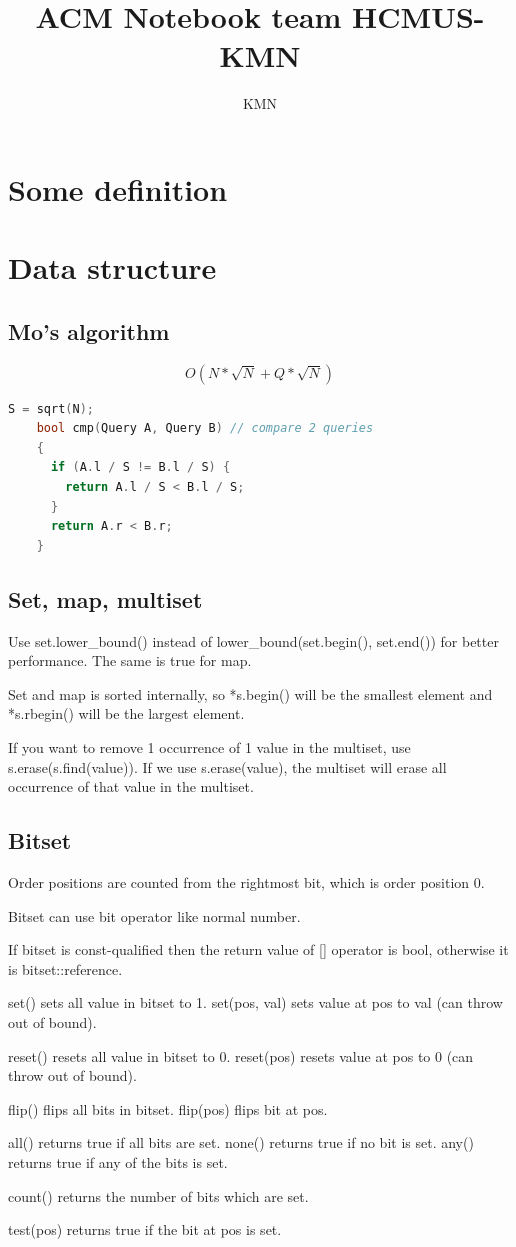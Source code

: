 \documentclass[A4 paper, 12pt, oneside, landscape]{article}
\title{ACM Notebook team HCMUS-KMN}
\author{KMN}
\begin{document}
	\begin{multicols}{2}
	\tableofcontents
	\small
	
\section{Some definition}
	

\section{Data structure}
	\subsection{Mo's algorithm}
    \[O(N * \sqrt{N} + Q * \sqrt{N}) \]
	\begin{lstlisting}[language=C++]
    S = sqrt(N);
    bool cmp(Query A, Query B) // compare 2 queries
    {
      if (A.l / S != B.l / S) {
        return A.l / S < B.l / S;
      }
      return A.r < B.r;
    }
    \end{lstlisting}
	
	\subsection{Set, map, multiset}
	Use set.lower_bound() instead of lower_bound(set.begin(), set.end()) for better performance. The same is true for map. \par 
	Set and map is sorted internally, so *s.begin() will be the smallest element and *s.rbegin() will be the largest element. \par 
	If you want to remove 1 occurrence of 1 value in the multiset, use s.erase(s.find(value)). If we use s.erase(value), the multiset will erase all occurrence of that value in the multiset.
	
	\subsection{Bitset}
	Order positions are counted from the rightmost bit, which is order position 0. \par 
	Bitset can use bit operator like normal number. \par
	If bitset is const-qualified then the return value of [] operator is bool, otherwise it is bitset::reference. \par
	set() sets all value in bitset to 1. set(pos, val) sets value at pos to val (can throw out of bound). \par
	reset() resets all value in bitset to 0. reset(pos) resets value at pos to 0 (can throw out of bound). \par 
	flip() flips all bits in bitset. flip(pos) flips bit at pos. \par 
	all() returns true if all bits are set. none() returns true if no bit is set. any() returns true if any of the bits is set. \par 
	count() returns the number of bits which are set. \par 
	test(pos) returns true if the bit at pos is set.
	

\end{multicols}
\end{document}
